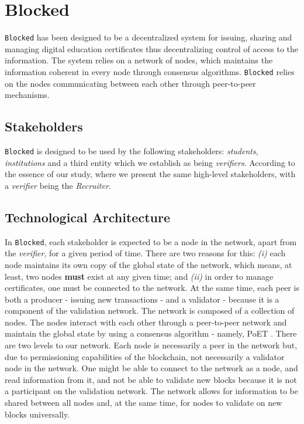 \section{Blocked}
\label{chap:design}

\texttt{Blocked} has been designed to be a decentralized system for issuing, sharing and managing digital education certificates thus decentralizing control of access to the information. The system relies on a network of nodes, which maintains the information coherent in every node through consensus algorithms. \texttt{Blocked} relies on the nodes communicating between each other through peer-to-peer mechanisms.

\subsection{Stakeholders}
\label{sec:design-entities}

\texttt{Blocked} is designed to be used by the following stakeholders: \textit{students}, \textit{institutions} and a third entity which we establish as being \textit{verifiers}. According to the essence of our study, where we present the same high-level stakeholders, with a \textit{verifier} being the \textit{Recruiter}.

\subsection{Technological Architecture}
\label{sec:design-architecture}

In \texttt{Blocked}, each stakeholder is expected to be a node in the network, apart from the \textit{verifier}, for a given period of time. There are two reasons for this: \emph{(i)} each node maintains its own copy of the global state of the network, which means, at least, two nodes \textbf{must} exist at any given time; and \emph{(ii)} in order to manage certificates, one must be connected to the network. At the same time, each peer is both a producer - issuing new transactions - and a validator - because it is a component of the validation network. The network is composed of a collection of nodes. The nodes interact with each other through a peer-to-peer network and maintain the global state by using a consensus algorithm - namely, PoET \cite{intel_poet}. There are two levels to our network. Each node is necessarily a peer in the network but, due to permissioning capabilities of the blockchain, not necessarily a validator node in the network. One might be able to connect to the network as a node, and read information from it, and not be able to validate new blocks because it is not a participant on the validation network. The network allows for information to be shared between all nodes and, at the same time, for nodes to validate on new blocks universally.

